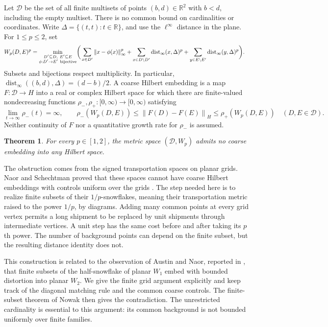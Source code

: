 \documentclass[11pt]{article}
\newtheorem{theorem}{Theorem}
\theoremstyle{remark}
\newcommand{\R}{\mathbb R}
\newcommand{\D}{\mathcal D}
\newcommand{\norm}[1]{\left\lVert#1\right\rVert}
\begin{document}
Let \(\D\) be the set of all finite multisets of points \((b,d)\in\R^2\) with \(b<d\), including the empty multiset. There is no common bound on cardinalities or coordinates. Write
\(\Delta=\{(t,t):t\in\R\}\), and use the \(\ell^\infty\) distance in the plane. For \(1\le p\le2\), set
\begin{align}
 W_p(D,E)^p
 =\min_{\substack{D'\subseteq D,\ E'\subseteq E\\
                    \phi:D'\to E'\ {\rm bijective}}}
 \biggl(&\sum_{x\in D'}\norm{x-\phi(x)}_\infty^p
       +\sum_{x\in D\setminus D'}\operatorname{dist}_\infty(x,\Delta)^p
       +\sum_{y\in E\setminus E'}\operatorname{dist}_\infty(y,\Delta)^p\biggr).
 \label{eq:diagram}
\end{align}
Subsets and bijections respect multiplicity. In particular,
\(\operatorname{dist}_\infty((b,d),\Delta)=(d-b)/2\).
A coarse Hilbert embedding is a map \(F:\D\to H\) into a real or complex Hilbert space for which there are finite-valued nondecreasing functions
\(\rho_-,\rho_+:[0,\infty)\to[0,\infty)\) satisfying
\begin{equation}
 \lim_{t\to\infty}\rho_-(t)=\infty,\qquad
 \rho_-(W_p(D,E))\le\norm{F(D)-F(E)}_H\le\rho_+(W_p(D,E))
 \quad(D,E\in\D).
 \label{eq:coarse}
\end{equation}
Neither continuity of \(F\) nor a quantitative growth rate for \(\rho_-\) is assumed.

\begin{theorem}\label{thm:main}
For every \(p\in[1,2]\), the metric space \((\D,W_p)\) admits no coarse embedding into any Hilbert space.
\end{theorem}

The obstruction comes from the signed transportation spaces on planar grids. Naor and Schechtman proved that these spaces cannot have coarse Hilbert embeddings with controls uniform over the grids \cite[Theorem~3.7]{ns}. The step needed here is to realize finite subsets of their \(1/p\)-snowflakes, meaning their transportation metric raised to the power \(1/p\), by diagrams. Adding many common points at every grid vertex permits a long shipment to be replaced by unit shipments through intermediate vertices. A unit step has the same cost before and after taking its \(p\)th power. The number of background points can depend on the finite subset, but the resulting distance identity does not.

This construction is related to the observation of Austin and Naor, reported in \cite[Section~1.5, p.~8]{ann}, that finite subsets of the half-snowflake of planar \(W_1\) embed with bounded distortion into planar \(W_2\). We give the finite grid argument explicitly and keep track of the diagonal matching rule and the common coarse controls. The finite-subset theorem of Nowak \cite[Theorem~3.4]{nowak} then gives the contradiction. The unrestricted cardinality is essential to this argument: its common background is not bounded uniformly over finite families.
\end{document}
